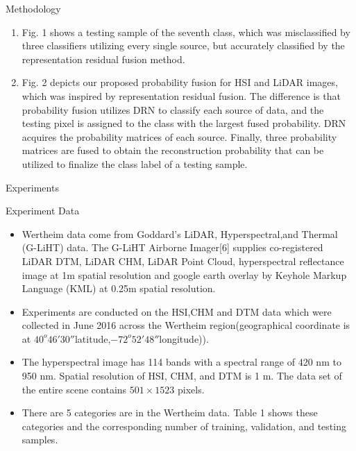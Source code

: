 \documentclass{beamer}
\begin{document}
\begin{frame}{Methodology}
    \begin{enumerate}
        \item Fig. 1 shows a testing sample of the seventh class, which was  misclassified  by  three  classifiers  utilizing  every  single source, but accurately classified by the representation residual fusion method.
        \item Fig.   2  depicts  our  proposed  probability  fusion  for  HSI and  LiDAR  images,  which  was  inspired  by  representation residual fusion.  The difference is that probability fusion utilizes  DRN  to  classify  each  source  of  data,  and  the  testing pixel is assigned to the class with the largest fused probability. DRN acquires the probability matrices of each source. Finally, three probability matrices are fused to obtain the reconstruction probability that can be utilized to finalize the class label of a testing sample.
    \end{enumerate}
\end{frame}

\begin{frame}{Experiments}
    \begin{block}{Experiment Data}
        \begin{itemize}
            \item Wertheim data come from Goddard’s LiDAR, Hyperspectral,and Thermal (G-LiHT) data.  The G-LiHT Airborne Imager[6]  supplies  co-registered  LiDAR  DTM,  LiDAR  CHM,  LiDAR Point Cloud, hyperspectral reflectance image at 1m spatial resolution and google earth overlay by Keyhole Markup Language (KML) at 0.25m spatial resolution.
            \item Experiments are conducted on the HSI,CHM and DTM data which were collected in June 2016 across the Wertheim region(geographical coordinate is at $40^o 46' 30''$latitude,$−72^o 52' 48''$longitude)).
            \item The  hyperspectral  image  has  114 bands with a spectral range of 420 nm to 950 nm. Spatial resolution of HSI, CHM, and DTM is 1 m. The data set of the entire scene contains $501\times 1523$ pixels.  
            \item There are 5 categories are in the Wertheim data. Table 1 shows these categories and the corresponding number of training, validation, and testing samples.
        \end{itemize}
    \end{block}
\end{frame}
\end{document}
